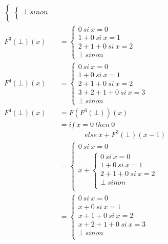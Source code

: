 \documentclass[11pt,a4paper]{article}
\begin{document}
\begin{align*}
\begin{cases}
\begin{cases}
						\bot \ sinon\\
					\end{cases}
			\end{cases}\\
		F^3(\bot)(x) &=	\begin{cases}
							0\ si\ x = 0\\
							1 + 0\ si\ x = 1\\
							2 + 1 + 0\ si\ x = 2\\
							\bot\ sinon
						\end{cases}\\	
		F^4(\bot)(x) &=	\begin{cases}
							0\ si\ x = 0\\
							1 + 0\ si\ x = 1\\
							2 + 1 + 0\ si\ x = 2\\
							3 + 2 + 1 + 0\ si\ x = 3\\
							\bot\ sinon
						\end{cases}\\	
		F^4(\bot)(x) &= F(F^3(\bot))(x)\\
		&= if\ x = 0\ then\ 0\\
		&\ \ \ \ \ \ \ \ \ \ \ \ \ \ \ \ else\ x + F^3(\bot)(x - 1)\\
		&=	\begin{cases}
				0\ si\ x = 0\\
				x + \begin{cases}
						0\ si\ x = 0\\
						1 + 0\ si\ x = 1\\
						2 + 1 + 0\ si\ x = 2\\
						\bot\ sinon\\
					\end{cases}
			\end{cases}\\
		&=	\begin{cases}
				0\ si\ x = 0\\
				x + 0\ si\ x = 1\\
				x + 1 + 0\ si\ x = 2\\
				x + 2 + 1 + 0\ si\ x = 3\\
				\bot\ sinon\\
			\end{cases}\\
	\end{align*}
\end{document}
